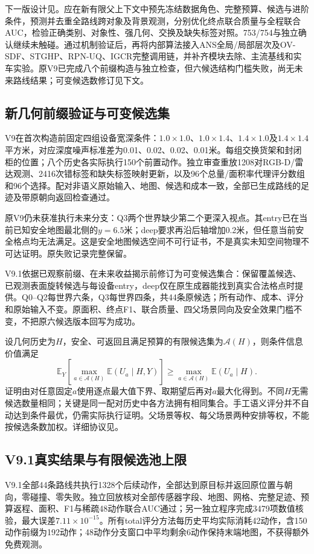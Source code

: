 \documentclass[11pt,a4paper]{article}
\begin{document}
下一版设计见。应在新有限父上下文中预先冻结数据角色、完整预算、候选与进阶条件，预测并去重全路线跨对象及背景观测，分别优化终点联合质量与全程联合AUC，检验正确类别、对象性、强几何、交换及缺失标签对照。753/754与独立确认继续未触碰。通过机制验证后，再将内部算法接入ANS全局/局部层次及OV-SDF、STGHP、RPN-UQ、IGCR完整调用链，并补齐模块去除、主流基线和实车实验。原V9已完成八个前缀构造与独立检查，但六候选结构门槛失败，尚无未来路线结果；可变候选数修订见下文。

\subsection{新几何前缀验证与可变候选集}
V9在首次构造前固定四组设备宽深条件：$1.0\times1.0$、$1.0\times1.4$、$1.4\times1.0$及$1.4\times1.4$平方米，对应深度噪声标准差为0.01、0.02、0.02、0.01米。每组交换货架和封闭柜的位置；八个历史各实际执行150个前置动作。独立审查重放1208对RGB-D/雷达观测、2416次错标签和缺失标签映射更新，以及96个总量/面积率代理评分数组和96个选择。配对非语义原始输入、地图、候选和成本一致，全部已生成路线的足迹及带原朝向返回检查通过。

原V9仍未获准执行未来分支：Q3两个世界缺少第二个更深入视点。其entry已在当前已知安全地图最北侧的$y=6.5$米；deep要求再沿后轴增加0.2米，但任意当前安全格点均无法满足。这是安全地图候选空间不可行证书，不是真实未知空间物理不可达证明。原失败记录完整保留。

V9.1依据已观察前缀、在未来收益揭示前修订为可变候选集合：保留覆盖候选、已观测表面旋转候选与每设备entry，deep仅在原生成器能找到真实合法格点时提供。Q0--Q2每世界六条，Q3每世界四条，共44条原候选；所有动作、成本、评分和原始输入不变。原面积、终点F1、联合质量、四父场景同向及安全效果门槛不变，不把原六候选版本回写为成功。

设几何历史为$H$，安全、可返回且满足预算的有限候选集为$\mathcal A(H)$，则条件信息价值满足
\begin{equation}
\mathbb E_Y\left[\max_{a\in\mathcal A(H)}\mathbb E(U_a\mid H,Y)\right]
\geq\max_{a\in\mathcal A(H)}\mathbb E(U_a\mid H).
\end{equation}
证明由对任意固定$a$使用逐点最大值下界、取期望后再对$a$最大化得到。不同$H$无需候选数量相同；关键是同一配对历史中各方法拥有相同集合。手工语义评分并不自动达到条件最优，仍需实际执行证明。父场景等权、每父场景两种安排等权，不能按候选条数加权。详细协议见。

\subsection{V9.1真实结果与有限候选池上限}
V9.1全部44条路线共执行1328个后续动作，全部达到原目标并返回原位置与朝向，零碰撞、零失败。独立回放核对全部传感器字段、地图、网格、完整足迹、预算返程、面积、F1与稀疏48动作联合AUC通过；另一独立程序完成3479项数值核验，最大误差$7.11\times10^{-15}$。所有total评分方法每历史平均实际消耗42动作，含150动作前缀为192动作；48动作分支窗口中平均剩余6动作保持末端地图，不获得额外免费观测。
\end{document}

